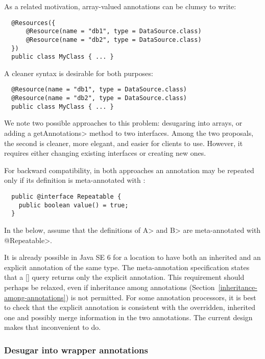 \documentclass[10pt]{article}
\begin{document}
As a related motivation, array-valued annotations can be clumsy to write:

\begin{Verbatim}
  @Resources({
      @Resource(name = "db1", type = DataSource.class)
      @Resource(name = "db2", type = DataSource.class)
  })
  public class MyClass { ... }
\end{Verbatim}

A cleaner syntax is desirable for both purposes:

\begin{Verbatim}
  @Resource(name = "db1", type = DataSource.class)
  @Resource(name = "db2", type = DataSource.class)
  public class MyClass { ... }
\end{Verbatim}

We note two possible approaches to this problem:  desugaring into arrays,
or adding a \<getAnnotations> method to two interfaces.
Among the two proposals, the second is cleaner, more elegant, and easier
for clients to use.  However, it requires either changing existing
interfaces or creating new ones.

For backward compatibility, in both approaches an annotation may be
repeated only if its definition is meta-annotated with :

\begin{Verbatim} 
  public @interface Repeatable {
    public boolean value() = true;
  }
\end{Verbatim}

\noindent
In the below, assume that the definitions of \<A> and \<B> are
meta-annotated with \<@Repeatable>.



It is already possible in Java SE 6 for a location to have both an
inherited and an explicit annotation of the same type.  The 
 meta-annotation specification states that a
[] query returns only the
explicit annotation.  This requirement should perhaps be relaxed, even if
inheritance among annotations (Section~\ref{inheritance-among-annotations})
is not permitted.  For some annotation
processors, it is best to check that the explicit annotation is consistent
with the overridden, inherited one and possibly merge information in the
two annotations.  The current design makes that inconvenient to do.


\subsubsection{Desugar into wrapper annotations\label{duplicate-annotations-desugar}}
\end{document}
